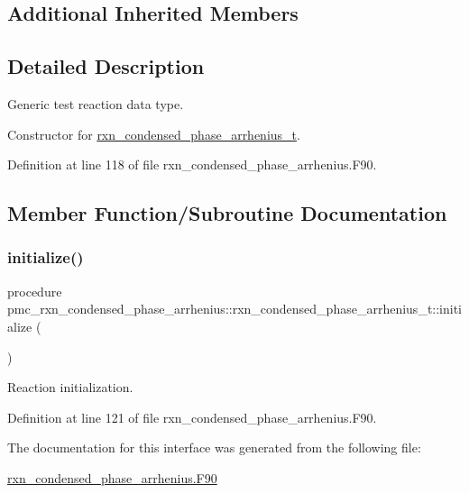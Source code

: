 \subsection*{Additional Inherited Members}


\subsection{Detailed Description}
Generic test reaction data type. 

Constructor for \mbox{\hyperlink{structpmc__rxn__condensed__phase__arrhenius_1_1rxn__condensed__phase__arrhenius__t}{rxn\+\_\+condensed\+\_\+phase\+\_\+arrhenius\+\_\+t}}. 

Definition at line 118 of file rxn\+\_\+condensed\+\_\+phase\+\_\+arrhenius.\+F90.



\subsection{Member Function/\+Subroutine Documentation}
\mbox{\label{structpmc__rxn__condensed__phase__arrhenius_1_1rxn__condensed__phase__arrhenius__t_aa8ad8be81fae8483f8ca9cd8697fef30}} 
\subsubsection{\texorpdfstring{initialize()}{initialize()}}
{\footnotesize\ttfamily procedure pmc\+\_\+rxn\+\_\+condensed\+\_\+phase\+\_\+arrhenius\+::rxn\+\_\+condensed\+\_\+phase\+\_\+arrhenius\+\_\+t\+::initialize (\begin{DoxyParamCaption}{ }\end{DoxyParamCaption})\hspace{0.3cm}{\ttfamily [private]}}



Reaction initialization. 



Definition at line 121 of file rxn\+\_\+condensed\+\_\+phase\+\_\+arrhenius.\+F90.



The documentation for this interface was generated from the following file\+:\begin{DoxyCompactItemize}
\item 
\mbox{\hyperlink{rxn__condensed__phase__arrhenius_8_f90}{rxn\+\_\+condensed\+\_\+phase\+\_\+arrhenius.\+F90}}\end{DoxyCompactItemize}

